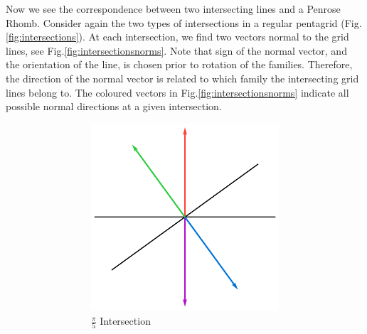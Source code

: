 \documentclass[
  oneside,
  11pt, a4paper,
  footinclude=true,
  headinclude=true,
  cleardoublepage=empty
]{scrbook}
\begin{document}
Now we see the correspondence between two intersecting lines and a Penrose Rhomb. Consider again the two types of intersections in a regular pentagrid (Fig.\ref{fig:intersections}). At each intersection, we find two vectors normal to the grid lines, see Fig.\ref{fig:intersectionsnorms}. Note that sign of the normal vector, and the orientation of the line, is chosen prior to rotation of the families. Therefore, the direction of the normal vector is related to which family the intersecting grid lines belong to. The coloured vectors in Fig.\ref{fig:intersectionsnorms} indicate all possible normal directions at a given intersection.
\begin{figure}[H]
\centering
\begin{subfigure}[b]{\textwidth}
\begin{subfigure}[b]{0.4\textwidth}
\centering
\includegraphics[width=\textwidth]{Intersection1Norms}
\caption{$\frac{\pi}{5}$ Intersection}
\end{subfigure}\hfill \Large \raisebox{80px}{$\rightarrow$}\hfil
\begin{subfigure}[b]{0.5\textwidth}
\centering

\end{subfigure}
\end{subfigure}
\end{figure}
\end{document}
